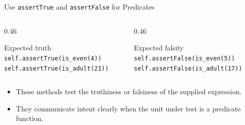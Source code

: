 \documentclass[aspectratio=169,10pt]{beamer}
\begin{document}
\begin{frame}{Use \texttt{assertTrue} and \texttt{assertFalse} for Predicates}
  \begin{columns}[T,onlytextwidth]
    \begin{column}{0.46\textwidth}
      \begin{block}{Expected truth}
        \texttt{self.assertTrue(is\_even(4))}\\
        \texttt{self.assertTrue(is\_adult(21))}
      \end{block}
    \end{column}

    \begin{column}{0.46\textwidth}
      \begin{block}{Expected falsity}
        \texttt{self.assertFalse(is\_even(5))}\\
        \texttt{self.assertFalse(is\_adult(17))}
      \end{block}
    \end{column}
  \end{columns}

  \begin{itemize}
    \item These methods test the truthiness or falsiness of the supplied expression.
    \item They communicate intent clearly when the unit under test is a predicate function.
  \end{itemize}
\end{frame}
\end{document}
